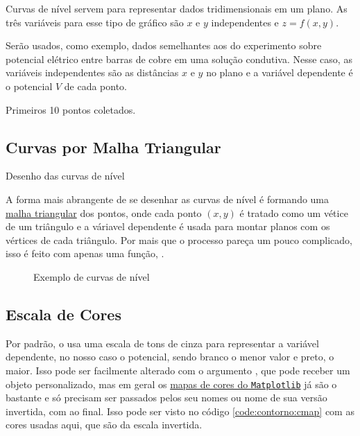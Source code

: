 Curvas de nível servem para representar dados tridimensionais em um plano. As três variáveis para esse tipo de gráfico são $x$ e $y$ independentes e $z = f(x,y)$.

Serão usados, como exemplo, dados semelhantes aos do experimento sobre potencial elétrico entre barras de cobre em uma solução condutiva. Nesse caso, as variáveis independentes são as distâncias $x$ e $y$ no plano e a variável dependente é o potencial $V$ de cada ponto.

\begin{table}[H]
    \centering
    
    \caption{Primeiros 10 pontos coletados.}
    \label{tab:contorno:dados}
\end{table}


\subsection{Curvas por Malha Triangular}
    \begin{listing}[H]
        \caption{Desenho das curvas de nível}
        \label{code:contorno:base}

    \end{listing}

    A forma mais abrangente de se desenhar as curvas de nível é formando uma \href{https://www.wikiwand.com/pt/Malha_triangular}{malha triangular} dos pontos, onde cada ponto $(x, y)$ é tratado como um vétice de um triângulo e a váriavel dependente é usada para montar planos com os vértices de cada triângulo. Por mais que o processo pareça um pouco complicado, isso é feito com apenas uma função, .

    \begin{figure}[H]
        \centering
        

        \caption{Exemplo de curvas de nível}
        \label{fig:contorno:base}
    \end{figure}


\subsection{Escala de Cores} \label{sec:contorno:cmap}

    Por padrão, o  usa uma escala de tons de cinza para representar a variável dependente, no nosso caso o potencial, sendo branco o menor valor e preto, o maior. Isso pode ser facilmente alterado com o argumento , que pode receber um objeto  personalizado, mas em geral os \href{https://matplotlib.org/3.1.0/gallery/color/colormap_reference.html}{mapas de cores do \texttt{Matplotlib}} já são o bastante e só precisam ser passados pelos seu nomes ou nome de sua versão invertida, com  ao final. Isso pode ser visto no código \ref{code:contorno:cmap} com as cores usadas aqui, que são da escala  invertida.

